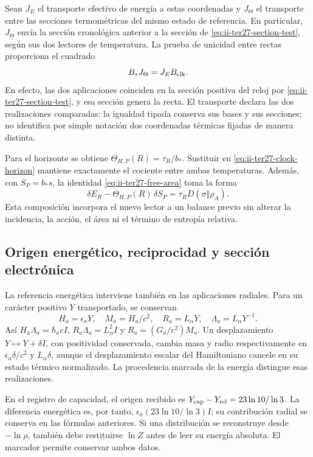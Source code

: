 Sean $J_E$ el transporte efectivo de energía a estas coordenadas y
$J_\Theta$ el transporte entre las secciones termométricas del mismo
estado de referencia. En particular, $J_\Theta$ envía la sección
cronológica anterior a la sección de \eqref{eq:ii-ter27-section-test},
según sus dos lectores de temperatura. La prueba de unicidad entre rectas
proporciona el cuadrado
\begin{equation}
 B_*J_\Theta=J_EB_{\rm clk}.
 \label{eq:ii-ter27-intertwiner}
\end{equation}
En efecto, las dos aplicaciones coinciden en la sección positiva del
reloj por \eqref{eq:ii-ter27-section-test}, y esa sección genera la recta.
El transporte declara las dos realizaciones comparadas: la igualdad
tipada conserva sus bases y sus secciones; no identifica por simple
notación dos coordenadas térmicas fijadas de manera distinta.

Para el horizonte se obtiene
$\Theta_{H,P}(R)=\tau_R/b_*$. Sustituir en
\eqref{eq:ii-ter27-clock-horizon} mantiene exactamente el cociente entre
ambas temperaturas. Además, con $S_P=b_*s$, la identidad
\eqref{eq:ii-ter27-free-area} toma la forma
\[
 \delta E_R-\Theta_{H,P}(R)\,\delta S_P
 =\tau_RD(\sigma\Vert\rho_A).
\]
Esta composición incorpora el nuevo lector a un balance previo sin
alterar la incidencia, la acción, el área ni el término de entropía relativa.

\subsection{Origen energético, reciprocidad y sección electrónica}
\label{subsec:ii-ter27-electron}

La referencia energética interviene también en las aplicaciones radiales.
Para un carácter positivo $Y$ transportado, se conservan
\[
 H_a=\epsilon_aY,\quad M_a=H_a/c^2,\quad
 R_a=L_\alpha Y,\quad \Lambda_a=L_\alpha Y^{-1}.
\]
Así $H_a\Lambda_a=\hbar_acI$, $R_a\Lambda_a=L_\alpha^2I$ y
$R_a=(G_a/c^2)M_a$. Un desplazamiento $Y\mapsto Y+\delta I$,
con positividad conservada, cambia masa y radio respectivamente en
$\epsilon_a\delta/c^2$ y $L_\alpha\delta$, aunque el desplazamiento
escalar del Hamiltoniano cancele en su estado térmico normalizado.
La procedencia marcada de la energía distingue esas realizaciones.

En el registro de capacidad, el origen recibido es
$Y_{\rm cap}-Y_{\rm rel}=23\ln10/\ln3$.
La diferencia energética es, por tanto,
$\epsilon_a(23\ln10/\ln3)I$; su contribución radial se conserva
en las fórmulas anteriores. Si una distribución se reconstruye desde
$-\ln\rho$, también debe restituirse $\ln Z$ antes de leer su energía
absoluta. El marcador permite conservar ambos datos.

